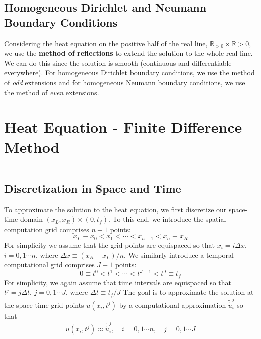 \documentclass[11pt]{article}
\newcommand{\R}{\mathbb{R}}
\begin{document}
\subsection{Homogeneous Dirichlet and Neumann  Boundary Conditions}
Considering the heat equation on the positive half of the real line, $\R_{>0} \times \R{>0}$, we use the \textbf{method of reflections} to extend the solution to the whole real line. We can do this since the solution is smooth (continuous and differentiable everywhere). For homogeneous Dirichlet boundary conditions, we use the method of \textit{odd} extensions and for homogeneous Neumann boundary conditions, we use the method of \textit{even} extensions. 


\pagebreak

\section{Heat Equation - Finite Difference Method}
\hrule \vspace{15pt}

\subsection{Discretization in Space and Time}
To approximate the solution to the heat equation, we first discretize our space-time domain $(x_L, x_R) \times (0, t_f )$. To this end, we introduce the spatial computation grid comprises $n + 1$ points:
$$x_L \equiv x_0 <x_1 < \cdots < x_{n-1} <x_n \equiv x_R$$
 For simplicity we assume that the grid points are equispaced so that $x_i = i \Delta x$, $i = 0,1\cdots n$, where $\Delta x \equiv (x_R - x_L)/n$. We similarly introduce a temporal computational grid comprises $J + 1$ points:
$$0 \equiv t^0 <t^1 < \cdots < t^{J-1} <t^J \equiv t_f$$
For simplicity, we again assume that time intervals are equispaced so that $t^j = j \Delta t$, $j = 0,1\cdots J$, where $\Delta t \equiv t_f/J$
The goal is to approximate the solution at the space-time grid points $u(x_i,t^j)$
by a computational approximation $\tilde{\tilde{u}}_i^j$ so that
$$u(x_i,t^j) \approx \tilde{\tilde{u}}_i^j, \quad i = 0,1\cdots n, \quad  j= 0,1 \cdots J$$
\end{document}
